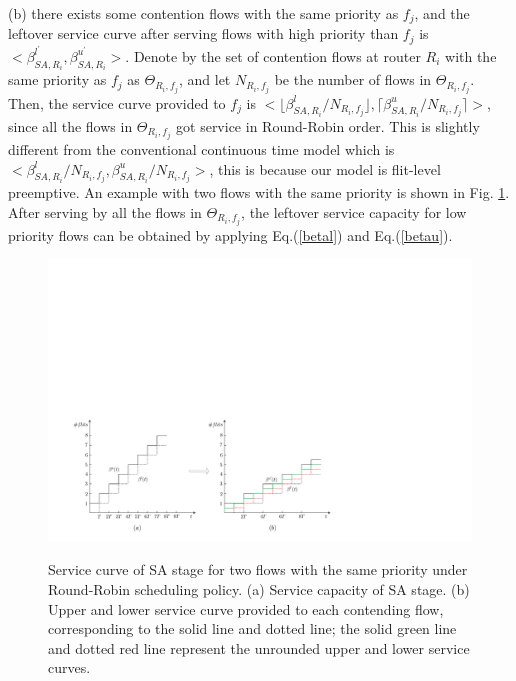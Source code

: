 \documentclass[10pt,journal]{IEEEtran}
\begin{document}
(b) there exists some contention flows with the same priority as $f_j$, and the leftover service curve after serving flows with high priority than $f_j$ is $<\beta_{SA,R_i}^{l^\prime},\beta_{SA,R_i}^{u^\prime}>$. Denote by the set of contention flows at router $R_i$ with the same priority as $f_j$ as $\Theta_{R_i,f_j}$, and let $N_{R_i,f_j}$ be the number of flows in $\Theta_{R_i,f_j}$. Then, the service curve provided to $f_j$ is $<\lfloor\beta^l_{SA,R_i}/N_{R_i,f_j}\rfloor,\lceil\beta^u_{SA,R_i}/N_{R_i,f_j}\rceil>$, since all the flows in $\Theta_{R_i,f_j}$ got service in Round-Robin order. This is slightly different from the conventional continuous time model which is $<\beta^l_{SA,R_i}/N_{R_i,f_j},\beta^u_{SA,R_i}/N_{R_i,f_j}>$, this is because our model is flit-level preemptive. An example with two flows with the same priority is shown in Fig. \ref{roundrobin}. After serving by all the flows in $\Theta_{R_i,f_j}$, the leftover service capacity for low priority flows can be obtained by applying Eq.(\ref{betal}) and Eq.(\ref{betau}).
\begin{figure}
  \centering
  \includegraphics[scale=0.5]{figures/RoundRobin.pdf}\\
  \caption{Service curve of SA stage for two flows with the same priority under Round-Robin scheduling policy. (a) Service capacity of SA stage. (b) Upper and lower service curve provided to each contending flow, corresponding to the solid line and dotted line; the solid green line and dotted red line represent the unrounded upper and lower service curves.}\label{roundrobin}
\end{figure}
\end{document}

